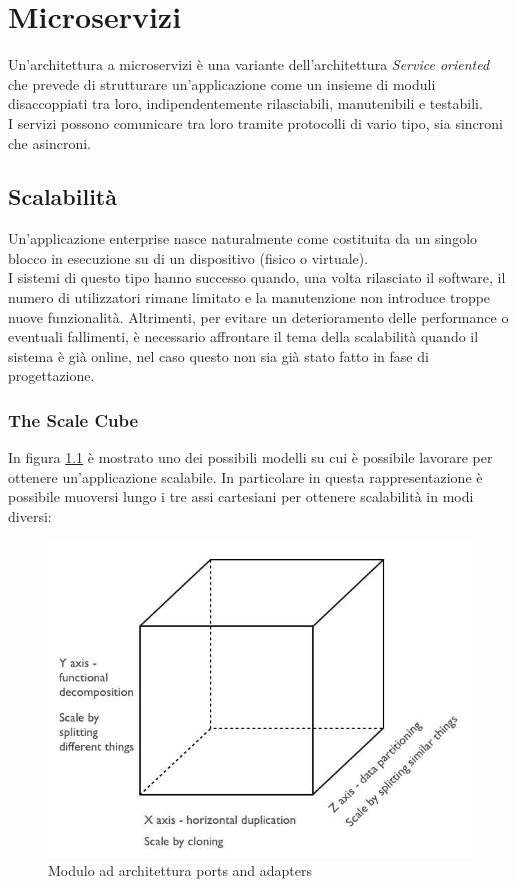 \chapter{Microservizi}

Un'architettura a microservizi è una variante dell'architettura \textit{Service oriented} che prevede di strutturare un'applicazione come un insieme di moduli disaccoppiati tra loro, indipendentemente rilasciabili, manutenibili e testabili.\\
I servizi possono comunicare tra loro tramite protocolli di vario tipo, sia sincroni che asincroni.

\section{Scalabilità}
Un'applicazione enterprise nasce naturalmente come costituita da un singolo blocco in esecuzione su di un dispositivo (fisico o virtuale).\\
I sistemi di questo tipo hanno successo quando, una volta rilasciato il software, il numero di utilizzatori rimane limitato e la manutenzione non introduce troppe nuove funzionalità.
Altrimenti, per evitare un deterioramento delle performance o eventuali fallimenti, è necessario affrontare il tema della scalabilità quando il sistema è già online, nel caso questo non sia già stato fatto in fase di progettazione.

\subsection{The Scale Cube}
In figura \ref{fig:scale_cube}\cite{the_art_of_scalability} è mostrato uno dei possibili modelli su cui è possibile lavorare per ottenere un'applicazione scalabile.
In particolare in questa rappresentazione è possibile muoversi lungo i tre assi cartesiani per ottenere scalabilità in modi diversi:

\begin{figure}[h]
	\centering
	\includegraphics[scale=0.5]{img/scale_cube}
	\caption{Modulo ad architettura ports and adapters}
	\label{fig:scale_cube}
\end{figure}


